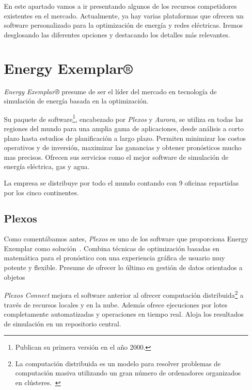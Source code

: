 
En este apartado vamos a ir presentando algunos de los recursos competidores existentes en el mercado. Actualmente, ya hay varias plataformas que ofrecen un software personalizado para la optimización de energía y redes eléctricas. Iremos desglosando las diferentes opciones y destacando los detalles más relevantes.

\section{Energy Exemplar®}

\textit{Energy Exemplar®} presume de ser el líder del mercado en tecnología de simulación de energía basada en la optimización. 

Su paquete de software\footnote{Publican su primera versión en el año 2000.}, encabezado por \textit{Plexos} y \textit{Aurora}, se utiliza en todas las regiones del mundo para una amplia gama de aplicaciones, desde análisis a corto plazo hasta estudios de planificación a largo plazo. Permiten minimizar los costos operativos y de inversión, maximizar las ganancias y obtener pronósticos mucho mas precisos. Ofrecen sus servicios como el mejor software de simulación de energía eléctrica, gas y agua.  

La empresa se distribuye por todo el mundo contando con 9 oficinas repartidas por los cinco continentes.

\subsection{Plexos}

Como comentábamos antes, \textit{Plexos} es uno de los software que proporciona Energy Exemplar como solución~\cite{web:EnergyExemplarPlexos}. Combina técnicas de optimización basadas en matemática para el pronóstico con una experiencia gráfica de usuario muy potente y flexible. Presume de ofrecer lo último en gestión de datos orientados a objetos

\textit{Plexos Connect} mejora el software anterior al ofrecer computación distribuida\footnote{La computación distribuida es un modelo para resolver problemas de computación masiva utilizando un gran número de ordenadores organizados en clústeres.~\cite{web:computacionDistribuida}} a través de recursos locales y en la nube. Además ofrece ejecuciones por lotes completamente automatizadas y operaciones en tiempo real. Aloja los resultados de simulación en un repositorio central.

